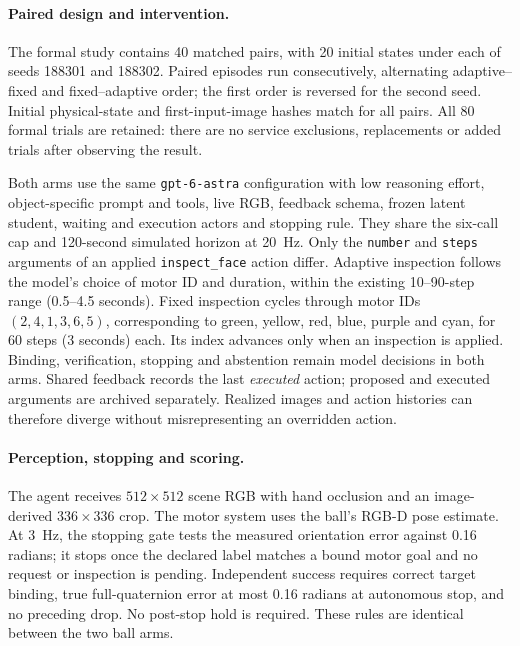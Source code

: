 \paragraph{Paired design and intervention.}
The formal study contains 40 matched pairs, with 20 initial states under each of seeds 188301 and 188302. Paired episodes run consecutively, alternating adaptive--fixed and fixed--adaptive order; the first order is reversed for the second seed. Initial physical-state and first-input-image hashes match for all pairs. All 80 formal trials are retained: there are no service exclusions, replacements or added trials after observing the result.

Both arms use the same \texttt{gpt-6-astra} configuration with low reasoning effort, object-specific prompt and tools, live RGB, feedback schema, frozen latent student, waiting and execution actors and stopping rule. They share the six-call cap and 120-second simulated horizon at 20~Hz. Only the \texttt{number} and \texttt{steps} arguments of an applied \texttt{inspect\_face} action differ. Adaptive inspection follows the model's choice of motor ID and duration, within the existing 10--90-step range (0.5--4.5 seconds). Fixed inspection cycles through motor IDs $(2,4,1,3,6,5)$, corresponding to green, yellow, red, blue, purple and cyan, for 60 steps (3 seconds) each. Its index advances only when an inspection is applied. Binding, verification, stopping and abstention remain model decisions in both arms. Shared feedback records the last \emph{executed} action; proposed and executed arguments are archived separately. Realized images and action histories can therefore diverge without misrepresenting an overridden action.

\paragraph{Perception, stopping and scoring.}
The agent receives $512\times512$ scene RGB with hand occlusion and an image-derived $336\times336$ crop. The motor system uses the ball's RGB-D pose estimate. At 3~Hz, the stopping gate tests the measured orientation error against 0.16 radians; it stops once the declared label matches a bound motor goal and no request or inspection is pending. Independent success requires correct target binding, true full-quaternion error at most 0.16 radians at autonomous stop, and no preceding drop. No post-stop hold is required. These rules are identical between the two ball arms.

